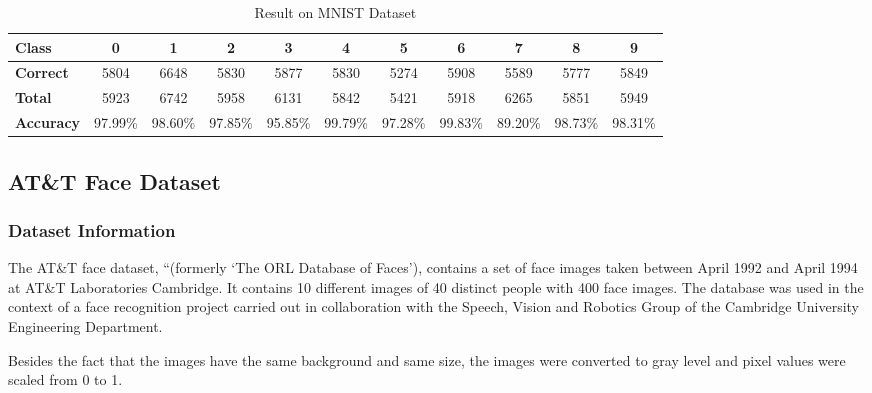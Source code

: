 \documentclass[
12pt,
tightenlines,
aps,
prb,
twocolumn,
superscriptaddress,
longbibliography,
floatfix
]{revtex4-2}
\begin{document}
\onecolumngrid
\begin{center}
\begin{table}[h]
    \centering
    \begin{center}
    \caption{Result on MNIST Dataset}
    \label{tab:mnsit}
    \begin{tabular}{l|cccccccccc}
    \hline
    \textbf{Class}    & 0       & 1       & 2       & 3       & 4       & 5       & 6       & 7       & 8       & 9       \\
    \hline \hline
    \textbf{Correct}  & 5804    & 6648    & 5830    & 5877    & 5830    & 5274    & 5908    & 5589    & 5777    & 5849    \\
    \textbf{Total}    & 5923    & 6742    & 5958    & 6131    & 5842    & 5421    & 5918    & 6265    & 5851    & 5949    \\
    \textbf{Accuracy} & 97.99\% & 98.60\% & 97.85\% & 95.85\% & 99.79\% & 97.28\% & 99.83\% & 89.20\% & 98.73\% & 98.31\%\\
    \hline
    \end{tabular}
    \end{center}
\end{table}
\end{center}
\twocolumngrid

\subsection{AT\&T Face Dataset}
\subsubsection{Dataset Information}
The AT\&T face dataset, “(formerly ‘The ORL Database of Faces’), contains a set of face images taken between April 1992 and April 1994 at AT&T Laboratories Cambridge. It contains 10 different images of 40 distinct people with 400 face images. The database was used in the context of a face recognition project carried out in collaboration with the Speech, Vision and Robotics Group of the Cambridge University Engineering Department.

Besides the fact that the images have the same background and same size, the images were converted to gray level and pixel values were scaled from 0 to 1.
\vspace{-5mm}
\end{document}
